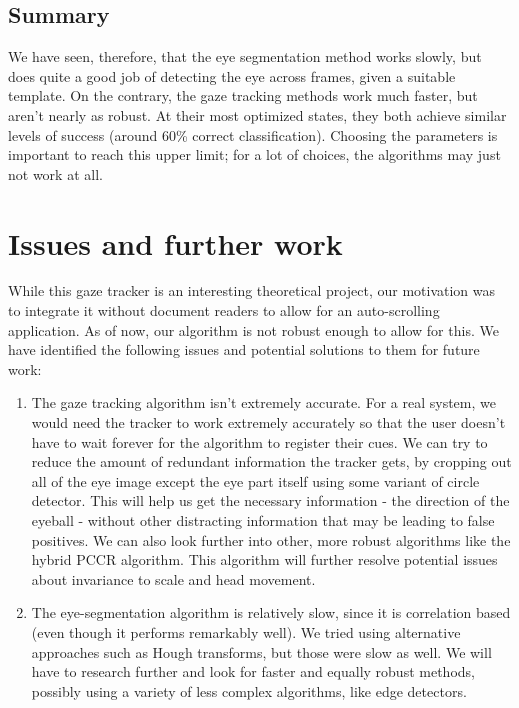 \documentclass[12pt,letterpaper]{article}
\begin{document}
\newpage

\begin{multicols}{2}

\subsection{Summary}
\label{scn:summary}

We have seen, therefore, that the eye segmentation method works slowly, but does quite a good job of
detecting the eye across frames, given a suitable template. On the contrary, the gaze tracking methods 
work much faster, but aren't nearly as robust. At their most optimized states, they both achieve
similar levels of success (around 60\% correct classification). Choosing the parameters is important to 
reach this upper limit; for a lot of choices, the algorithms may just not work at all. 




\section{Issues and further work}
\label{scn:issues}

While this gaze tracker is an interesting theoretical project, our motivation was to integrate it without
document readers to allow for an auto-scrolling application. As of now, our algorithm is not robust enough
to allow for this. We have identified the following issues and potential solutions to them for future work:

\begin{enumerate}
\item
The gaze tracking algorithm isn't extremely accurate. For a real system, we would need the tracker to work
extremely accurately so that the user doesn't have to wait forever for the algorithm to register their
cues. We can try to reduce the amount of redundant information the tracker gets, by cropping out all of the
eye image except the eye part itself using some variant of circle detector. This will help us get the 
necessary information - the direction of the eyeball - without other distracting information that may be
leading to false positives. We can also look further into other, more robust algorithms like the hybrid 
PCCR algorithm\cite{pccr-dynamic}. This algorithm will further resolve potential issues about invariance 
to scale and head movement.
\item 
The eye-segmentation algorithm is relatively slow, since it is correlation based (even though it performs 
remarkably well). We tried using alternative approaches such as Hough transforms, but those were slow as 
well. We will have to research further and look for faster and equally robust methods, possibly using a
variety of less complex algorithms, like edge detectors. 
\end{enumerate}

\end{multicols}


\newpage


\end{document}
